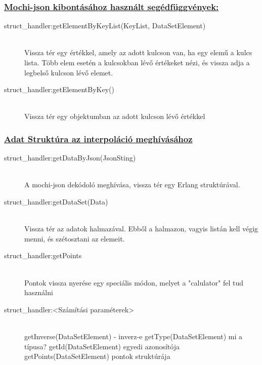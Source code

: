 	\subsubsection{\underline{
		Mochi-json kibontásához használt segédfüggvények:
	}}
	\begin{description}
		\item[struct\_handler:getElementByKeyList(KeyList, DataSetElement)] \hfill \\ 
		Vissza tér egy értékkel, amely az adott kulcson van, ha egy elemű a kulcs lista. Több elem esetén a kulcsokban lévő értékeket nézi, és vissza adja a legbelső kulcson lévő elemet.

		\item[struct\_handler:getElementByKey()] \hfill \\ 
		Vissza tér egy objektumban az adott kulcson lévő értékkel
	\end{description}
	\subsubsection{\underline{Adat Struktúra az interpoláció meghívásához}}
	\begin{description}

		\item[struct\_handler:getDataByJson(JsonSting)] \hfill \\
		A mochi-json dekódoló meghívása, vissza tér egy Erlang struktúrával.
		
		\item[struct\_handler:getDataSet(Data)]\hfill \\ 
		Vissza tér az adatok halmazával. Ebből a halmazon, vagyis listán kell végig menni, és szétosztani az elemeit. 
		
		\item[struct\_handler:getPoints] \hfill \\
		Pontok vissza nyerése egy speciális módon, melyet a "calulator" fel tud használni

		

		\item[struct\_handler:<Számítási paraméterek>] \hfill \\ 
		getInverse(DataSetElement) - inverz-e \newline
		getType(DataSetElement) mi a típusa? \newline
		getId(DataSetElement) egyedi azonosítója \newline
		getPoints(DataSetElement) pontok struktúrája
	\end{description}
